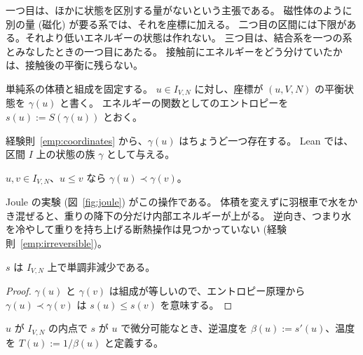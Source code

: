 一つ目は、ほかに状態を区別する量がないという主張である。
磁性体のように別の量 (磁化) が要る系では、それを座標に加える。
二つ目の区間には下限がある。それより低いエネルギーの状態は作れない。
三つ目は、結合系を一つの系とみなしたときの一つ目にあたる。
接触前にエネルギーをどう分けていたかは、接触後の平衡に残らない。

\begin{definition}[エネルギーで並べた状態]
  \label{def:energy-curve}
  \leanok
  単純系の体積と組成を固定する。
  $u \in I_{V,N}$ に対し、座標が $(u, V, N)$ の平衡状態を $\gamma(u)$ と書く。
  エネルギーの関数としてのエントロピーを $s(u) := S(\gamma(u))$ とおく。
\end{definition}

経験則~\ref{emp:coordinates} から、$\gamma(u)$ はちょうど一つ存在する。
Lean では、区間 $I$ 上の状態の族 $\gamma$ として与える。

\begin{empirical}[かき混ぜでエネルギーを上げられる]
  \label{emp:stirring}
  \leanok
  $u, v \in I_{V,N}$、$u \le v$ なら $\gamma(u) \prec \gamma(v)$。
\end{empirical}

Joule の実験 (図~\ref{fig:joule}) がこの操作である。
体積を変えずに羽根車で水をかき混ぜると、重りの降下の分だけ内部エネルギーが上がる。
逆向き、つまり水を冷やして重りを持ち上げる断熱操作は見つかっていない (経験則~\ref{emp:irreversible})。

\begin{theorem}[エントロピーはエネルギーとともに増える]
  \label{thm:entropy-monotone-energy}
  \leanok
  $s$ は $I_{V,N}$ 上で単調非減少である。
\end{theorem}

\begin{proof}
  \leanok
  $\gamma(u)$ と $\gamma(v)$ は組成が等しいので、エントロピー原理から $\gamma(u) \prec \gamma(v)$ は $s(u) \le s(v)$ を意味する。
\end{proof}

\begin{definition}[温度]
  \label{def:temperature}
  \leanok
  $u$ が $I_{V,N}$ の内点で $s$ が $u$ で微分可能なとき、逆温度を $\beta(u) := s'(u)$、温度を $T(u) := 1/\beta(u)$ と定義する。
\end{definition}

